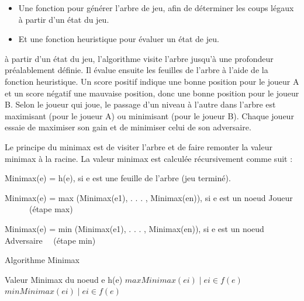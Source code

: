 \documentclass[11pt]{article}
\newcommand{\tmtextit}[1]{{\itshape{#1}}}
\newenvironment{itemizedot}{\begin{itemize} \renewcommand{\labelitemi}{$\bullet$}\renewcommand{\labelitemii}{$\bullet$}\renewcommand{\labelitemiii}{$\bullet$}\renewcommand{\labelitemiv}{$\bullet$}}{\end{itemize}}
\newcommand{\algorithmicoutput}{\textbf{Sortie:}}
\newcommand{\Output}{\item[\algorithmicoutput]}
\begin{document}
\begin{itemizedot}
  \item Une fonction pour générer l'arbre de jeu, afin de
  déterminer les coups légaux à partir d'un état du jeu.
  
  \item Et une fonction heuristique pour évaluer un état de jeu.
\end{itemizedot}

à partir d'un état du jeu, l'algorithme visite l'arbre jusqu'à une
profondeur préalablement définie. Il évalue ensuite les feuilles
de l'arbre à l'aide de la fonction heuristique. Un score positif indique
une bonne position pour le joueur A et un score négatif une mauvaise
position, donc une bonne position pour le joueur B. Selon le joueur qui joue,
le passage d'un niveau à l'autre dans l'arbre est maximisant (pour le
joueur A) ou minimisant (pour le joueur B). Chaque joueur essaie de maximiser
son gain et de minimiser celui de son adversaire.

Le principe du minimax est de visiter l'arbre et de faire remonter la valeur
minimax à la racine. La valeur minimax est calculée récursivement
comme suit :

\begin{itemizedot}
  \tmtextit{\item Minimax(e) = h(e), si e est une feuille de l'arbre (jeu
  terminé).
  
  \item Minimax(e) = max (Minimax(e1), . . . , Minimax(en)), si e est un noeud
  Joueur \ \ \ \ \ \ (étape max)
  
  \item Minimax(e) = min (Minimax(e1), . . . , Minimax(en)), si e est un noeud
  Adversaire \ \ (étape min)}
\end{itemizedot}



\begin{algorithm}
  \caption{Algorithme Minimax}

  \begin{algorithmic}
  	\Statex{}
  	\Output{Valeur Minimax du noeud e}
        \Return h(e)
      \Else
	      \Return $max{Minimax(ei) \mid ei \in f(e)}$
	    \Else 
	      \Return $min{Minimax(ei) \mid ei \in f(e)}$
	    \EndIf
	  \EndIf
    \EndFunction
  \end{algorithmic}
\end{algorithm}
\end{document}
